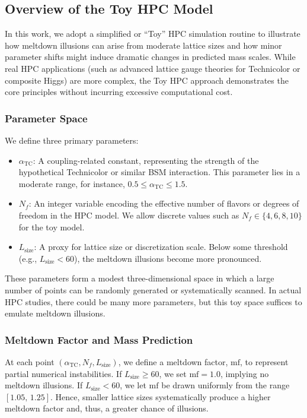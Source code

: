 \documentclass[11pt]{article}
\begin{document}
\subsection{Overview of the Toy HPC Model}

In this work, we adopt a simplified or ``Toy'' HPC simulation routine
to illustrate how meltdown illusions can arise from moderate lattice sizes
and how minor parameter shifts might induce dramatic changes in predicted mass scales.
While real HPC applications (such as advanced lattice gauge theories
for Technicolor or composite Higgs) are more complex, the Toy HPC approach
demonstrates the core principles without incurring excessive computational cost.

\subsubsection{Parameter Space}

We define three primary parameters:

\begin{itemize}
\item $\alpha_{\mathrm{TC}}$: A coupling-related constant, representing
      the strength of the hypothetical Technicolor or similar BSM interaction.
      This parameter lies in a moderate range, for instance, $0.5 \leq \alpha_{\mathrm{TC}} \leq 1.5$.
\item $N_f$: An integer variable encoding the effective number of flavors
      or degrees of freedom in the HPC model. We allow discrete values such as
      $N_f \in \{4,6,8,10\}$ for the toy model.
\item $L_{\mathrm{size}}$: A proxy for lattice size or discretization scale.
      Below some threshold (e.g., $L_{\mathrm{size}} < 60$),
      the meltdown illusions become more pronounced.
\end{itemize}

These parameters form a modest three-dimensional space
in which a large number of points can be randomly generated or systematically scanned.
In actual HPC studies, there could be many more parameters,
but this toy space suffices to emulate meltdown illusions.

\subsubsection{Meltdown Factor and Mass Prediction}

At each point $(\alpha_{\mathrm{TC}}, N_f, L_{\mathrm{size}})$,
we define a meltdown factor, $\mathrm{mf}$, to represent partial numerical instabilities.
If $L_{\mathrm{size}} \geq 60$, we set $\mathrm{mf} = 1.0$,
implying no meltdown illusions. If $L_{\mathrm{size}} < 60$, we let
$\mathrm{mf}$ be drawn uniformly from the range $[1.05,\,1.25]$.
Hence, smaller lattice sizes systematically produce
a higher meltdown factor and, thus, a greater chance of illusions.
\end{document}
